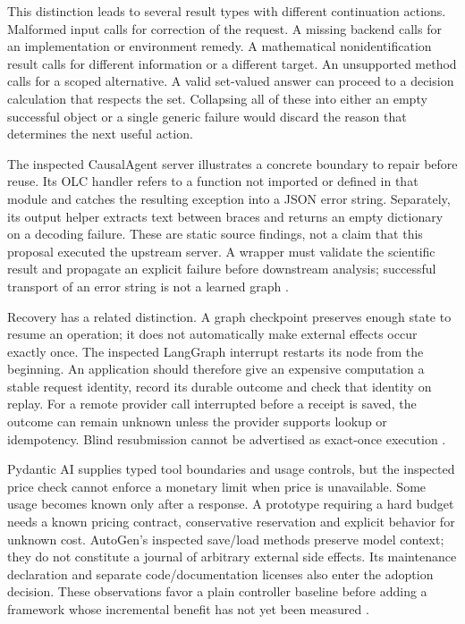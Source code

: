 This distinction leads to several result types with different continuation
actions. Malformed input calls for correction of the request. A missing backend
calls for an implementation or environment remedy. A mathematical
nonidentification result calls for different information or a different target.
An unsupported method calls for a scoped alternative. A valid set-valued answer
can proceed to a decision calculation that respects the set. Collapsing all of
these into either an empty successful object or a single generic failure would
discard the reason that determines the next useful action.

The inspected CausalAgent server illustrates a concrete boundary to repair
before reuse. Its OLC handler refers to a function not imported or defined in
that module and catches the resulting exception into a JSON error string.
Separately, its output helper extracts text between braces and returns an
empty dictionary on a decoding failure. These are static source findings, not
a claim that this proposal executed the upstream server. A wrapper must
validate the scientific result and propagate an explicit failure before
downstream analysis; successful transport of an error string is not a learned
graph \citep{v12_la_package_causalagent}.

Recovery has a related distinction. A graph checkpoint preserves enough state
to resume an operation; it does not automatically make external effects occur
exactly once. The inspected LangGraph interrupt restarts its node from the
beginning. An application should therefore give an expensive computation a
stable request identity, record its durable outcome and check that identity on
replay. For a remote provider call interrupted before a receipt is saved, the
outcome can remain unknown unless the provider supports lookup or idempotency.
Blind resubmission cannot be advertised as exact-once execution
\citep{v12_la04_langgraph}.

Pydantic AI supplies typed tool boundaries and usage controls, but the inspected
price check cannot enforce a monetary limit when price is unavailable. Some
usage becomes known only after a response. A prototype requiring a hard budget
needs a known pricing contract, conservative reservation and explicit behavior
for unknown cost. AutoGen's inspected save/load methods preserve model context;
they do not constitute a journal of arbitrary external side effects. Its
maintenance declaration and separate code/documentation licenses also enter
the adoption decision. These observations favor a plain controller baseline
before adding a framework whose incremental benefit has not yet been measured
\citep{v12_la04_pydantic_ai,v12_la04_autogen}.

